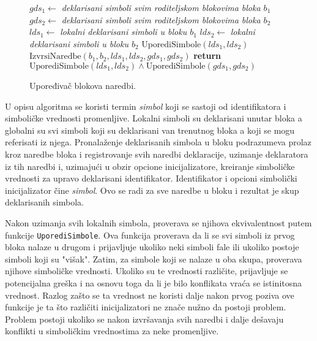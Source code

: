 \begin{figure}[!h]
\begin{algorithmic}[1]
\State $gds_1 \gets $ \emph{deklarisani simboli svim roditeljskom blokovima bloka $b_1$}
\State $gds_2 \gets $ \emph{deklarisani simboli svim roditeljskom blokovima bloka $b_2$}
\State $lds_1 \gets $ \emph{lokalni deklarisani simboli u bloku $b_1$}
\State $lds_2 \gets $ \emph{lokalni deklarisani simboli u bloku $b_2$}
\State $\text{UporediSimbole}(lds_1, lds_2)$
\State $\text{IzvrsiNaredbe}(b_1, b_2, lds_1, lds_2, gds_1, gds_2)$
\State \textbf{return} $\text{UporediSimbole}(lds_1, lds_2) \wedge \text{UporediSimbole}(gds_1, gds_2)$
\EndProcedure
\end{algorithmic}
\caption{Upoređivač blokova naredbi.}
\label{fig:ComparisonAlgorithmBlocksPseudo}
\end{figure}

U opisu algoritma se koristi termin \emph{simbol} koji se sastoji od identifikatora i simboličke vrednosti promenljive. Lokalni simboli su deklarisani unutar bloka a globalni su svi simboli koji su deklarisani van trenutnog bloka a koji se mogu referisati iz njega. Pronalaženje deklarisanih simbola u bloku podrazumeva prolaz kroz naredbe bloka i registrovanje svih naredbi deklaracije, uzimanje deklaratora iz tih naredbi i, uzimajući u obzir opcione inicijalizatore, kreiranje simboličke vrednosti za upravo deklarisani identifikator. Identifikator i opcioni simbolički inicijalizator čine \emph{simbol}. Ovo se radi za sve naredbe u bloku i rezultat je skup deklarisanih simbola.

Nakon uzimanja svih lokalnih simbola, proverava se njihova ekvivalentnost putem funkcije \texttt{UporediSimbole}. Ova funkcija proverava da li se svi simboli iz prvog bloka nalaze u drugom i prijavljuje ukoliko neki simboli fale ili ukoliko postoje simboli koji su "višak". Zatim, za simbole koji se nalaze u oba skupa, proverava njihove simboličke vrednosti. Ukoliko su te vrednosti različite, prijavljuje se potencijalna greška i na osnovu toga da li je bilo konflikata vraća se istinitosna vrednost. Razlog zašto se ta vrednost ne koristi dalje nakon prvog poziva ove funkcije je ta što različiti inicijalizatori ne znače nužno da postoji problem. Problem postoji ukoliko se nakon izvršavanja svih naredbi i dalje dešavaju konflikti u simboličkim vrednostima za neke promenljive. 

